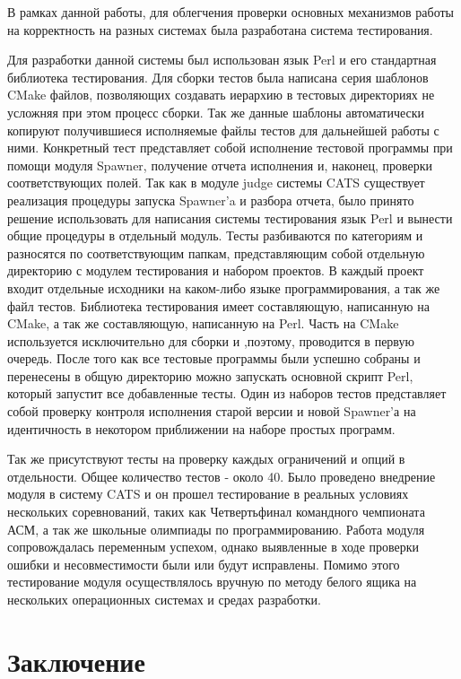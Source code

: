 \documentclass{imcs}
\begin{document}
В рамках данной работы, для облегчения проверки основных механизмов работы на корректность на разных системах была разработана система тестирования.

Для разработки данной системы был использован язык Perl и его стандартная библиотека тестирования. Для сборки тестов была написана серия шаблонов CMake файлов, позволяющих создавать иерархию в тестовых директориях не усложняя при этом процесс сборки. Так же данные шаблоны автоматически копируют получившиеся исполняемые файлы тестов для дальнейшей работы с ними.
Конкретный тест представляет собой исполнение тестовой программы при помощи модуля Spawner, получение отчета исполнения и, наконец, проверки соответствующих полей. Так как в модуле judge системы CATS существует реализация процедуры запуска Spawner'a и разбора отчета, было принято решение использовать для написания системы тестирования язык Perl и вынести общие процедуры в отдельный модуль.
Тесты разбиваются по категориям и разносятся по соответствующим папкам, представляющим собой отдельную директорию с модулем тестирования и набором проектов. В каждый проект входит отдельные исходники на каком-либо языке программирования, а так же файл тестов. Библиотека тестирования имеет составляющую, написанную на CMake, а так же составляющую, написанную на Perl. Часть на CMake используется исключительно для сборки и ,поэтому, проводится в первую очередь. После того как все тестовые программы были успешно собраны и перенесены в общую директорию можно запускать основной скрипт Perl, который запустит все добавленные тесты.
Один из наборов тестов представляет собой проверку контроля исполнения старой версии и новой Spawner'а на идентичность в некотором приближении на наборе простых программ.

Так же присутствуют тесты на проверку каждых ограничений и опций в отдельности.
Общее количество тестов - около 40. 
Было проведено внедрение модуля в систему CATS и он прошел тестирование в реальных условиях нескольких соревнований, таких как Четвертьфинал командного чемпионата АСМ, а так же школьные олимпиады по программированию. Работа модуля сопровождалась переменным успехом, однако выявленные в ходе проверки ошибки и несовместимости были или будут исправлены. Помимо этого тестирование модуля осуществлялось вручную по методу белого ящика на нескольких операционных системах и средах разработки.


\pagebreak

\section*{Заключение}
\end{document}
